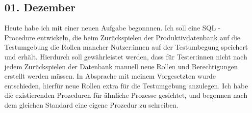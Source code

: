 \subsection{01. Dezember}
Heute habe ich mit einer neuen Aufgabe begonnnen. Ich soll eine SQL - Procedure entwickeln, die beim Zurückspielen der Produktivdatenbank auf die Testumgebung die Rollen mancher Nutzer:innen auf der Testumbegung speichert und erhält. Hierdurch soll gewährleistet werden, dass für Tester:innen nicht nach jedem Zurückspielen der Datenbank manuell neue Rollen und Berechtigungen erstellt werden müssen. In Absprache mit meinem Vorgesetzten wurde entschieden, hierfür neue Rollen extra für die Testumgebung anzulegen. Ich habe die existierenden Prozeduren für ähnliche Prozesse gesichtet, und begonnen nach dem gleichen Standard eine eigene Prozedur zu schreiben.